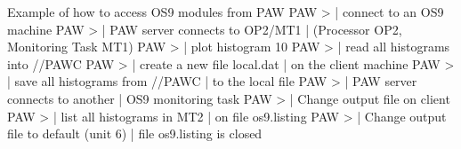 \begin{XMPt}{Example of how to access OS9 modules from PAW}
PAW >                             | connect to an OS9 machine
PAW >                       | PAW server connects to OP2/MT1
                                                 | (Processor OP2, Monitoring Task MT1)
PAW >                               | plot histogram 10
PAW >                                      | read all histograms into //PAWC
PAW >               | create a new file local.dat
                                                 | on the client machine
PAW >                                     | save all histograms from //PAWC
                                                 | to the local file
PAW >                       | PAW server connects to another
                                                 | OS9 monitoring task
PAW >                       | Change output file on client
PAW >                                 | list all histograms in MT2
                                                 | on file os9.listing
PAW >                                 | Change output file to default (unit 6)
                                                 | file os9.listing is closed
\end{XMPt}


